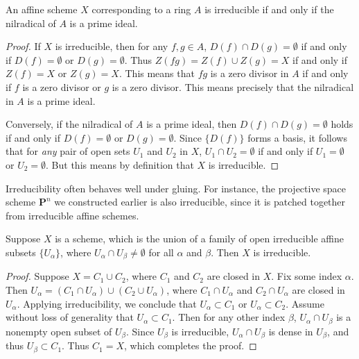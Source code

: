 \begin{lemma}
    An affine scheme $X$ corresponding to a ring $A$ is irreducible if and only if the nilradical of $A$ is a prime ideal.
\end{lemma}
\begin{proof}
    If $X$ is irreducible, then for any $f,g \in A$, $D(f) \cap D(g) = \emptyset$ if and only if $D(f) = \emptyset$ or $D(g) = \emptyset$. Thus $Z(fg) = Z(f) \cup Z(g) = X$ if and only if $Z(f) = X$ or $Z(g) = X$. This means that $fg$ is a zero divisor in $A$ if and only if $f$ is a zero divisor or $g$ is a zero divisor. This means precisely that the nilradical in $A$ is a prime ideal.

    Conversely, if the nilradical of $A$ is a prime ideal, then $D(f) \cap D(g) = \emptyset$ holds if and only if $D(f) = \emptyset$ or $D(g) = \emptyset$. Since $\{ D(f) \}$ forms a basis, it follows that for \emph{any} pair of open sets $U_1$ and $U_2$ in $X$, $U_1 \cap U_2 = \emptyset$ if and only if $U_1 = \emptyset$ or $U_2 = \emptyset$. But this means by definition that $X$ is irreducible.
\end{proof}

Irreducibility often behaves well under gluing. For instance, the projective space scheme $\mathbf{P}^n$ we constructed earlier is also irreducible, since it is patched together from irreducible affine schemes.

\begin{lemma}
    Suppose $X$ is a scheme, which is the union of a family of open irreducible affine subsets $\{ U_\alpha \}$, where $U_\alpha \cap U_\beta \neq \emptyset$ for all $\alpha$ and $\beta$. Then $X$ is irreducible.
\end{lemma}
\begin{proof}
    Suppose $X = C_1 \cup C_2$, where $C_1$ and $C_2$ are closed in $X$. Fix some index $\alpha$. Then $U_{\alpha} = (C_1 \cap U_{\alpha}) \cup (C_2 \cup U_{\alpha})$, where $C_1 \cap U_{\alpha}$ and $C_2 \cap U_{\alpha}$ are closed in $U_{\alpha}$. Applying irreducibility, we conclude that $U_{\alpha} \subset C_1$ or $U_{\alpha} \subset C_2$. Assume without loss of generality that $U_\alpha \subset C_1$. Then for any other index $\beta$, $U_\alpha \cap U_\beta$ is a nonempty open subset of $U_\beta$. Since $U_\beta$ is irreducible, $U_\alpha \cap U_\beta$ is dense in $U_\beta$, and thus $U_\beta \subset C_1$. Thus $C_1 = X$, which completes the proof.
\end{proof}

